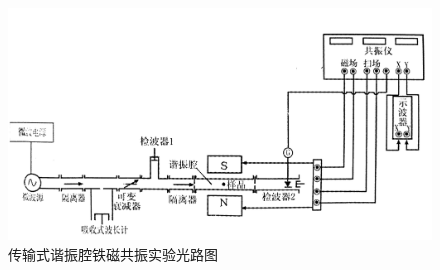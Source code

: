 \begin{figure}[htbp]
	\includegraphics[width=.8\textwidth]{fig/scan/ExperimentalopticalpathdiagramofTransmissionresonatorFerromagneticresonanceExperiment.png}
	\caption{传输式谐振腔铁磁共振实验光路图\label{fig:传输式谐振腔铁磁共振实验光路图}}
\end{figure}
